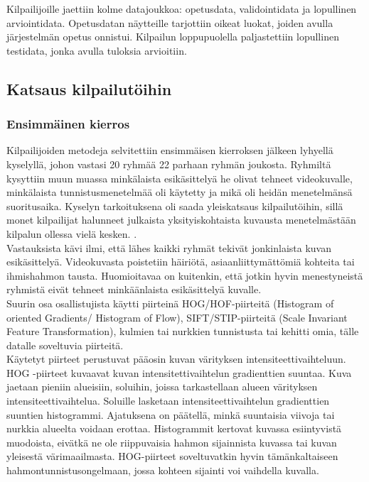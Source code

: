 Kilpailijoille jaettiin kolme datajoukkoa: opetusdata, validointidata ja lopullinen arviointidata.  Opetusdatan näytteille tarjottiin oikeat luokat, joiden avulla järjestelmän opetus onnistui.
Kilpailun loppupuolella paljastettiin lopullinen testidata, jonka avulla tuloksia arvioitiin.
\citep {6239178} \\


\subsection{Katsaus kilpailutöihin}
\subsubsection {Ensimmäinen kierros}
Kilpailijoiden metodeja selvitettiin ensimmäisen kierroksen jälkeen lyhyellä kyselyllä, johon vastasi 20 ryhmää 22 parhaan ryhmän joukosta.
Ryhmiltä kysyttiin muun muassa minkälaista esikäsittelyä he olivat tehneet videokuvalle, minkälaista tunnistusmenetelmää oli käytetty ja
mikä oli heidän menetelmänsä suoritusaika. Kyselyn tarkoituksena oli saada yleiskatsaus kilpailutöihin, sillä monet kilpailijat
halunneet julkaista yksityiskohtaista kuvausta menetelmästään kilpalun ollessa vielä kesken. \citep {6239178}. \\

Vastauksista kävi ilmi, että lähes kaikki ryhmät tekivät jonkinlaista kuvan esikäsittelyä. Videokuvasta poistetiin häiriötä, asiaanliittymättömiä 
kohteita tai ihmishahmon tausta. Huomioitavaa on kuitenkin, että jotkin hyvin menestyneistä ryhmistä eivät tehneet minkäänlaista esikäsittelyä kuvalle.
\citep {6239178}\\

Suurin osa osallistujista käytti piirteinä HOG/HOF-piirteitä (Histogram of oriented Gradients/ Histogram of Flow), SIFT/STIP-piirteitä (Scale Invariant Feature Transformation), 
kulmien tai nurkkien tunnistusta tai kehitti omia, tälle datalle soveltuvia piirteitä.\\

Käytetyt piirteet perustuvat pääosin kuvan värityksen intensiteettivaihteluun.
HOG -piirteet kuvaavat kuvan intensitettivaihtelun gradienttien suuntaa. Kuva jaetaan pieniin alueisiin, soluihin, 
joissa tarkastellaan alueen värityksen intensiteettivaihtelua. Soluille lasketaan intensiteettivaihtelun gradienttien suuntien histogrammi. 
Ajatuksena on päätellä, minkä suuntaisia viivoja tai nurkkia alueelta voidaan erottaa.\citep {1467360} Histogrammit kertovat kuvassa esiintyvistä
muodoista, eivätkä ne ole riippuvaisia hahmon sijainnista kuvassa tai kuvan yleisestä värimaailmasta.
HOG-piirteet soveltuvatkin hyvin tämänkaltaiseen hahmontunnistusongelmaan, jossa kohteen sijainti voi vaihdella kuvalla.\\

